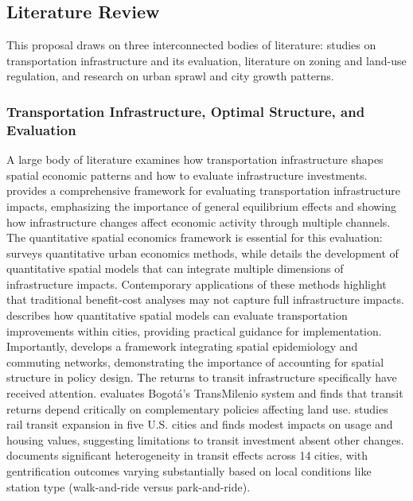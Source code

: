 \documentclass[12pt, a4paper]{article}
\begin{document}
\subsection{Literature Review}

This proposal draws on three interconnected bodies of literature: studies on transportation infrastructure and its evaluation, literature on zoning and land-use regulation, and research on urban sprawl and city growth patterns.

\subsubsection{Transportation Infrastructure, Optimal Structure, and Evaluation}

A large body of literature examines how transportation infrastructure shapes spatial economic patterns and how to evaluate infrastructure investments. \citet{Donaldson2025-wa} provides a comprehensive framework for evaluating transportation infrastructure impacts, emphasizing the importance of general equilibrium effects and showing how infrastructure changes affect economic activity through multiple channels. The quantitative spatial economics framework is essential for this evaluation: \citet{Redding2025-fr} surveys quantitative urban economics methods, while \citet{Redding2017-nf} details the development of quantitative spatial models that can integrate multiple dimensions of infrastructure impacts. Contemporary applications of these methods highlight that traditional benefit-cost analyses may not capture full infrastructure impacts. \citet{Severen2026-qx} describes how quantitative spatial models can evaluate transportation improvements within cities, providing practical guidance for implementation. Importantly, \citet{Fajgelbaum2021-fx} develops a framework integrating spatial epidemiology and commuting networks, demonstrating the importance of accounting for spatial structure in policy design. The returns to transit infrastructure specifically have received attention. \citet{Tsivanidis2023-hs} evaluates Bogotá's TransMilenio system and finds that transit returns depend critically on complementary policies affecting land use. \citet{Baum-Snow2000-xl} studies rail transit expansion in five U.S. cities and finds modest impacts on usage and housing values, suggesting limitations to transit investment absent other changes. \citet{Kahn2007-xc} documents significant heterogeneity in transit effects across 14 cities, with gentrification outcomes varying substantially based on local conditions like station type (walk-and-ride versus park-and-ride).
\end{document}
